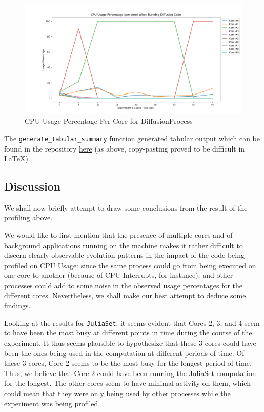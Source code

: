 \documentclass[a4paper,12pt]{article}
\begin{document}
\begin{figure}[h!]
  \centering
  \includegraphics[width=\textwidth]{images/cpuprofile_diffusion.png}
  \caption{CPU Usage Percentage Per Core for DiffusionProcess}
  \label{fig:cpuprofiler_diffusion}
\end{figure}

The \verb|generate_tabular_summary| function generated tabular output which can be found in the repository \href{https://github.com/paulmyr/DD2358-HPC25/blob/master/01_profiling/outputs/cpuprofile_diffusion.output}{here} (as above, copy-pasting proved to be difficult in \LaTeX). 

\subsection{Discussion}
We shall now briefly attempt to draw some conclusions from the result of the profiling above. 

We would like to first mention that the presence of multiple cores and of background applications running on the machine makes it rather difficult to discern clearly observable evolution patterns in the impact of the code being profiled on CPU Usage: since the same process could go from being executed on one core to another (because of CPU Interrupts, for instance), and other processes could add to some noise in the observed usage percentages for the different cores. Nevertheless, we shall make our best attempt to deduce some findings. 

Looking at the results for \verb|JuliaSet|, it seems evident that Cores 2, 3, and 4 seem to have been the most busy at different points in time during the course of the experiment. It thus seems plausible to hypothesize that these 3 cores could have been the ones being used in the computation at different periods of time. Of these 3 cores, Core 2 seems to be the most busy for the longest period of time. Thus, we believe that Core 2 could have been running the JuliaSet computation for the longest. The other cores seem to have minimal activity on them, which could mean that they were only being used by other processes while the experiment was being profiled.
\end{document}
